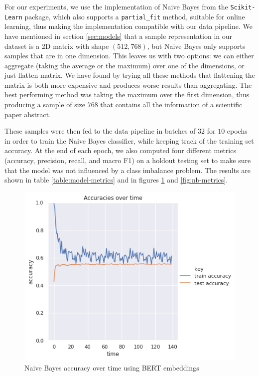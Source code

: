 \documentclass[12pt]{extreport}
\begin{document}
For our experiments, we use the implementation of Naive Bayes from the \texttt{Scikit-Learn} package, which also supports a \texttt{partial\_fit} method, suitable for online learning, thus making the implementation compatible with our data pipeline. We have mentioned in section \ref{sec:models} that a sample representation in our dataset is a 2D matrix with shape $(512, 768)$, but Naive Bayes only supports samples that are in one dimension. This leaves us with two options: we can either aggregate (taking the average or the maximum) over one of the dimensions, or just flatten matrix. We have found by trying all these methods that flattening the matrix is both more expensive and produces worse results than aggregating. The best performing method was taking the maximum over the first dimension, thus producing a sample of size $768$ that contains all the information of a scientific paper abstract.

These samples were then fed to the data pipeline in batches of $32$ for $10$ epochs in order to train the Naive Bayes classifier, while keeping track of the training set accuracy. At the end of each epoch, we also computed four different metrics (accuracy, precision, recall, and macro F1) on a holdout testing set to make sure that the model was not influenced by a class imbalance problem. The results are shown in table \ref{table:model-metrics} and in figures \ref{fig:nb-acc} and \ref{fig:nb-metrics}.

\begin{figure}[ht!]
\centering
\includegraphics[width=0.8\linewidth]{assets/framework/nb_BERT_accuracy_holdout.png}
\caption{Naive Bayes accuracy over time using BERT embeddings}
\label{fig:nb-acc}
\end{figure}
\end{document}
